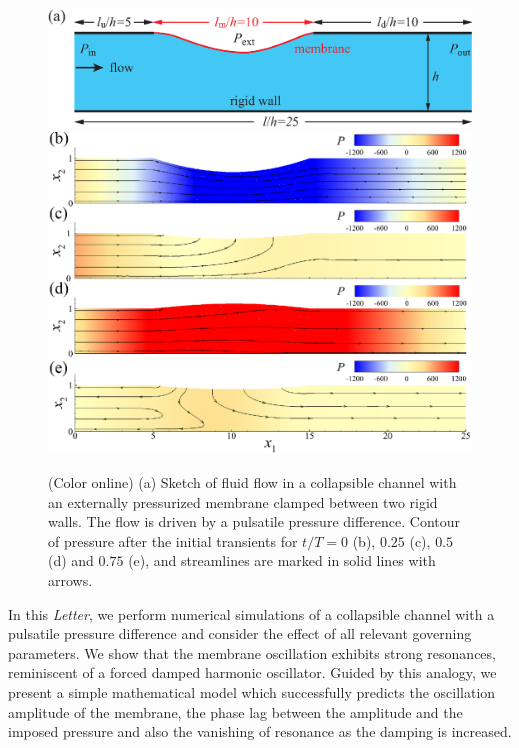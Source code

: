 \documentclass[aps,prl,reprint,superscriptaddress,floatfix]{revtex4-1}
\begin{document}
\begin{figure}
	\includegraphics[width=1\linewidth, trim={0cm 0cm -0.35cm 0cm}, clip]{./epsFig/fig1a.eps}
	\includegraphics[width=1\linewidth, trim={0.2cm 0cm 0cm 0cm}, clip]{./epsFig/fig1b.eps}	
	\caption{\label{fig:setup}(Color online) (a) Sketch of fluid flow in a collapsible channel with an externally pressurized membrane clamped between two rigid walls. The flow is driven by a pulsatile pressure difference. Contour of pressure after the initial transients for $t/T = 0$ (b), $0.25$ (c), $0.5$ (d) and $0.75$ (e), and streamlines are marked in solid lines with arrows.}	
\end{figure}

In this \emph{Letter}, we perform numerical simulations of a collapsible channel with a pulsatile pressure difference and consider the effect of all relevant governing parameters. We show that the membrane oscillation exhibits strong resonances, reminiscent of a forced damped harmonic oscillator. Guided by this analogy, we present a simple mathematical model which successfully predicts the oscillation amplitude of the membrane, the phase lag between the amplitude and the imposed pressure and also the vanishing of resonance as the damping is increased. 
\end{document}
